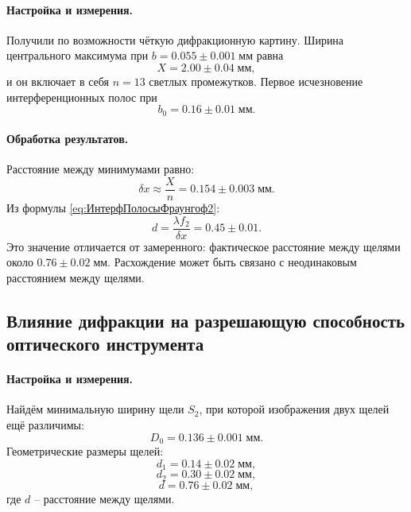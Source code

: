 \documentclass[a4paper]{article}
\begin{document}
\paragraph{Настройка и измерения.}

Получили по возможности чёткую дифракционную картину. Ширина центрального максимума при $ b=0.055\pm 0.001\; мм $ равна
\begin{equation*}\label{key}
	X = 2.00\pm 0.04 \;мм,
\end{equation*}
и он включает в себя $ n = 13 $ светлых промежутков.
Первое исчезновение интерференционных полос при
\begin{equation*}\label{key}
	b_0 = 0.16 \pm 0.01 \;мм.
\end{equation*}

\paragraph{Обработка результатов.}

Расстояние между минимумами равно:
\begin{equation*}\label{key}
	\delta x \approx \frac{X}{n} = 0.154\pm 0.003 \; мм.
\end{equation*}
Из формулы \eqref{eq:ИнтерфПолосыФраунгоф2}:
\begin{equation*}\label{key}
	d = \frac{\lambda f_2}{\delta x} = 0.45\pm 0.01.
\end{equation*}
Это значение отличается от замеренного: фактическое расстояние между щелями около $ 0.76\pm 0.02\; мм $. Расхождение может быть связано с неодинаковым расстоянием между щелями.

\subsection{Влияние дифракции на разрешающую способность оптического инструмента}

\paragraph{Настройка и измерения.}
Найдём минимальную ширину щели $ S_2 $, при которой изображения двух щелей ещё различимы:
\begin{equation*}\label{key}
	D_0 = 0.136\pm 0.001 \; мм.
\end{equation*}
Геометрические размеры щелей:
\begin{equation*}\label{key}
	d_1 = 0.14 \pm 0.02 \; мм,
\end{equation*}
\begin{equation*}\label{key}
	d_2 = 0.30 \pm 0.02 \; мм,
\end{equation*}
\begin{equation*}\label{key}
	d = 0.76 \pm 0.02 \; мм,
\end{equation*}
где $ d $ -- расстояние между щелями.
\end{document}
